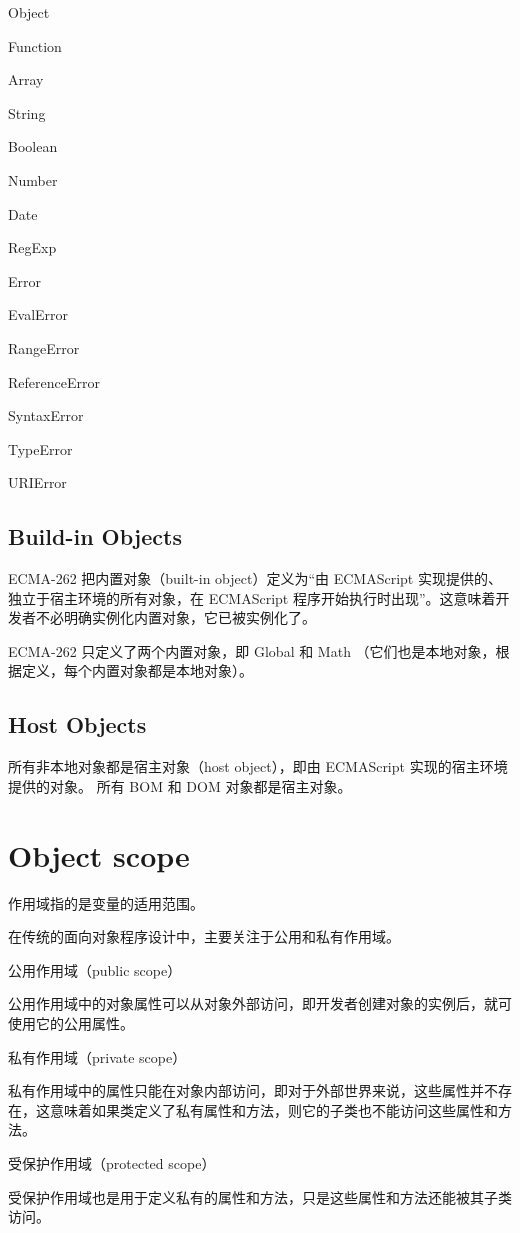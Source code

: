 \begin{compactitem}
\item Object
\item Function
\item Array
\item String
\item Boolean
\item Number
\item Date
\item RegExp
\item Error
\item EvalError
\item RangeError
\item ReferenceError
\item SyntaxError
\item TypeError
\item URIError
\end{compactitem}



\section{Build-in Objects}

ECMA-262 把内置对象（built-in object）定义为“由 ECMAScript 实现提供的、独立于宿主环境的所有对象，在 ECMAScript 程序开始执行时出现”。这意味着开发者不必明确实例化内置对象，它已被实例化了。

ECMA-262 只定义了两个内置对象，即 Global 和 Math （它们也是本地对象，根据定义，每个内置对象都是本地对象）。


\section{Host Objects}

所有非本地对象都是宿主对象（host object），即由 ECMAScript 实现的宿主环境提供的对象。
所有 BOM 和 DOM 对象都是宿主对象。


\chapter{Object scope}


作用域指的是变量的适用范围。

在传统的面向对象程序设计中，主要关注于公用和私有作用域。

\begin{compactitem}
\item 公用作用域（public scope）

公用作用域中的对象属性可以从对象外部访问，即开发者创建对象的实例后，就可使用它的公用属性。

\item 私有作用域（private scope）

私有作用域中的属性只能在对象内部访问，即对于外部世界来说，这些属性并不存在，这意味着如果类定义了私有属性和方法，则它的子类也不能访问这些属性和方法。
\item 受保护作用域（protected scope）

受保护作用域也是用于定义私有的属性和方法，只是这些属性和方法还能被其子类访问。

\end{compactitem}




